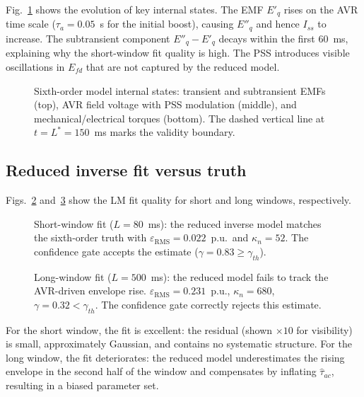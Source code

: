 \documentclass[journal,twoside,letterpaper]{IEEEtran}
\begin{document}
Fig.~\ref{fig:dq_states} shows the evolution of key
internal states.
The EMF $E'_q$ rises on the AVR time scale ($\tau_a = 0.05$~s
for the initial boost), causing $E''_q$ and hence $I_{ss}$
to increase.
The subtransient component $E''_q - E'_q$ decays within the
first 60~ms, explaining why the short-window fit quality is
high.
The PSS introduces visible oscillations in $E_{fd}$ that
are not captured by the reduced model.

\begin{figure}[!t]
  \centering
  
  \caption{Sixth-order model internal states: transient and
    subtransient EMFs (top), AVR field voltage with PSS
    modulation (middle), and mechanical/electrical torques
    (bottom).
    The dashed vertical line at $t = L^\ast = 150$~ms marks
    the validity boundary.}
  \label{fig:dq_states}
\end{figure}

\subsection{Reduced inverse fit versus truth}

Figs.~\ref{fig:short_window_fit} and~\ref{fig:long_window_fit}
show the LM fit quality for short and long windows, respectively.

\begin{figure}[!t]
  \centering
  
  \caption{Short-window fit ($L = 80$~ms): the reduced inverse
    model matches the sixth-order truth with
    $\varepsilon_{\mathrm{RMS}} = 0.022$~p.u.\
    and $\kappa_n = 52$.
    The confidence gate accepts the estimate
    ($\gamma = 0.83 \geq \gamma_{th}$).}
  \label{fig:short_window_fit}
\end{figure}

\begin{figure}[!t]
  \centering
  
  \caption{Long-window fit ($L = 500$~ms): the reduced model
    fails to track the AVR-driven envelope rise.
    $\varepsilon_{\mathrm{RMS}} = 0.231$~p.u.,
    $\kappa_n = 680$, $\gamma = 0.32 < \gamma_{th}$.
    The confidence gate correctly rejects this estimate.}
  \label{fig:long_window_fit}
\end{figure}

For the short window, the fit is excellent: the residual
(shown $\times 10$ for visibility) is small, approximately
Gaussian, and contains no systematic structure.
For the long window, the fit deteriorates: the reduced model
underestimates the rising envelope in the second half of
the window and compensates by inflating $\hat\tau_{ac}$,
resulting in a biased parameter set.
\end{document}
